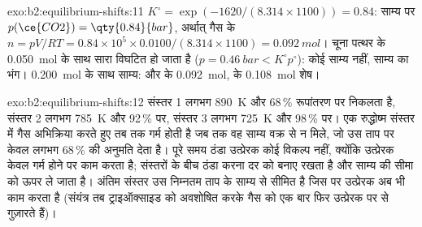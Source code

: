 \begin{solution}{exo:b2:equilibrium-shifts:11}
$K^\circ = \exp(-1620/(8.314 \times 1100)) = 0.84$: साम्य पर $p(\ce{CO2}) =
\qty{0.84}{bar}$, अर्थात् गैस के $n = pV/RT = 0.84 \times 10^5 \times
0.0100/(8.314 \times 1100) = \qty{0.092}{mol}$। चूना पत्थर के \qty{0.050}{mol}
के साथ सारा विघटित हो जाता है ($p = \qty{0.46}{bar} < K^\circ p^\circ$):
कोई साम्य नहीं, साम्य का भंग। \qty{0.200}{mol} के साथ साम्य:
 और  के \qty{0.092}{mol},  के \qty{0.108}{mol} शेष।
\end{solution}

\begin{solution}{exo:b2:equilibrium-shifts:12}
संस्तर 1 लगभग \qty{890}{K} और 68\,\% रूपांतरण पर निकलता है, संस्तर 2 लगभग
\qty{785}{K} और 92\,\% पर, संस्तर 3 लगभग \qty{725}{K} और 98\,\% पर। एक
रुद्धोष्म संस्तर में गैस अभिक्रिया करते हुए तब तक गर्म होती है जब तक वह साम्य
वक्र से न मिले, जो उस ताप पर केवल लगभग 68\,\% की अनुमति देता है। पूरे समय ठंडा
उत्प्रेरक कोई विकल्प नहीं, क्योंकि उत्प्रेरक केवल गर्म होने पर काम करता है; संस्तरों
के बीच ठंडा करना दर को बनाए रखता है और साम्य की सीमा को ऊपर ले जाता है। अंतिम संस्तर
उस निम्नतम ताप के साम्य से सीमित है जिस पर उत्प्रेरक
अब भी काम करता है (संयंत्र तब ट्राइऑक्साइड को अवशोषित करके गैस को एक बार फिर
उत्प्रेरक पर से गुज़ारते हैं)।
\end{solution}

